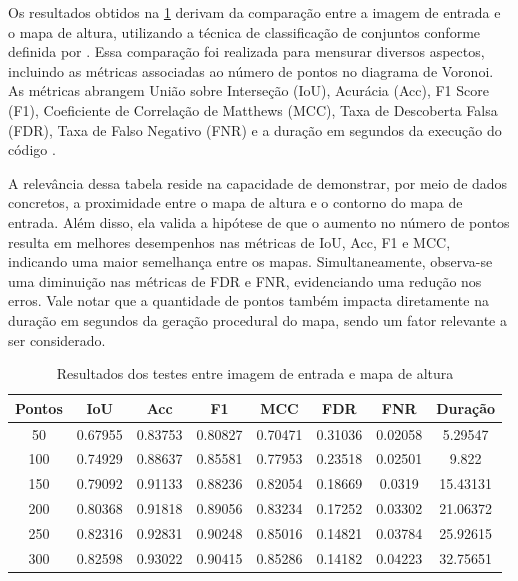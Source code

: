 Os resultados obtidos na \cref{tab:final_input_output_3d} derivam da comparação entre a imagem de entrada e o mapa de altura, utilizando a técnica de classificação de conjuntos conforme definida por \cite{kirillov2019panoptic}. Essa comparação foi realizada para mensurar diversos aspectos, incluindo as métricas associadas ao número de pontos no diagrama de Voronoi. As métricas abrangem União sobre Interseção (IoU), Acurácia (Acc), F1 Score (F1), Coeficiente de Correlação de Matthews (MCC), Taxa de Descoberta Falsa (FDR), Taxa de Falso Negativo (FNR) e a duração em segundos da execução do código \cite{Chicco2020, confusion_matrix_calculator, iou_metric_link}.

A relevância dessa tabela reside na capacidade de demonstrar, por meio de dados concretos, a proximidade entre o mapa de altura e o contorno do mapa de entrada. Além disso, ela valida a hipótese de que o aumento no número de pontos resulta em melhores desempenhos nas métricas de IoU, Acc, F1 e MCC, indicando uma maior semelhança entre os mapas. Simultaneamente, observa-se uma diminuição nas métricas de FDR e FNR, evidenciando uma redução nos erros. Vale notar que a quantidade de pontos também impacta diretamente na duração em segundos da geração procedural do mapa, sendo um fator relevante a ser considerado.


\begin{table}[h]
	\centering
	\caption{Resultados dos testes entre imagem de entrada e mapa de altura}
	\label{tab:final_input_output_3d}
	\begin{tabular}{|c|c|c|c|c|c|c|c|}
		\hline
						Pontos & IoU & Acc & F1 & MCC & FDR & FNR & Duração \\
		\hline
		50 & 0.67955 & 0.83753 & 0.80827 & 0.70471 & 0.31036 & 0.02058 & 5.29547\\
100 & 0.74929 & 0.88637 & 0.85581 & 0.77953 & 0.23518 & 0.02501 & 9.822\\
150 & 0.79092 & 0.91133 & 0.88236 & 0.82054 & 0.18669 & 0.0319 & 15.43131\\
200 & 0.80368 & 0.91818 & 0.89056 & 0.83234 & 0.17252 & 0.03302 & 21.06372\\
250 & 0.82316 & 0.92831 & 0.90248 & 0.85016 & 0.14821 & 0.03784 & 25.92615\\
300 & 0.82598 & 0.93022 & 0.90415 & 0.85286 & 0.14182 & 0.04223 & 32.75651\\
		\hline
	\end{tabular}
\end{table}

